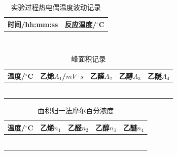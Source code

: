 \documentclass[a4paper]{article}
\begin{document}
\begin{table}[H]
	\begin{center}
		\begin{tabular}{l|l}
			\hline
			时间/hh:mm:ss &反应温度/$^\circ$C\\
			\hline
						  &                  \\
			\hline
						  &                  \\
			\hline
						  &                  \\
			\hline
						  &                  \\
			\hline
						  &                  \\
			\hline
						  &                  \\
			\hline
		 \end{tabular}
	\end{center}
	\caption{实验过程热电偶温度波动记录}
\end{table}

\begin{table}[H]
	\begin{center}
		\begin{tabular}{l|l|l|l|l}
			\hline
			温度/$^\circ$C &乙烯$A_{1}$/$mV\cdot s$    &乙醛$A_{2}$        &乙醇$A_{3}$     &乙醚$A_{4}$\\ 
			\hline
			&             &          &             & \\
			\hline
			&             &          &             & \\
			\hline
			&             &          &             & \\
			\hline
			&             &          &             & \\
			\hline
			&             &          &             & \\
			\hline
			&             &          &             & \\
			\hline
		 \end{tabular}
	\end{center}
	\caption{峰面积记录}
\end{table}

\begin{table}[H]
	\begin{center}
		\begin{tabular}{l|l|l|l|l}
			\hline
			温度/$^\circ$C &乙烯$n_{1}$  &乙醛$n_{2}$    &乙醇$n_{3}$   &乙醚$n_{4}$ \\ 
			\hline
			&             &          &             & \\
			\hline
			&             &          &             & \\
			\hline
			&             &          &             & \\
			\hline
			&             &          &             & \\
			\hline
			&             &          &             & \\
			\hline
			&             &          &             & \\
			\hline
		 \end{tabular}
	\end{center}
	\caption{面积归一法摩尔百分浓度}
\end{table}
\end{document}

